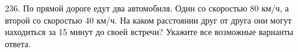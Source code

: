 236. По прямой дороге едут два автомобиля. Один со скоростью 80 км/ч, а второй со скоростью 40 км/ч. На каком расстоянии друг от друга они могут находиться за 15 минут до своей встречи? Укажите все возможные варианты ответа.\\
